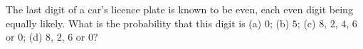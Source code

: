 The last digit of a car's licence plate is known to be even, each even digit being equally likely. What is the probability that this digit is (a) $0$; (b) $5$; (c) $8$, $2$, $4$, $6$ or $0$; (d) $8$, $2$, $6$ or $0$?
